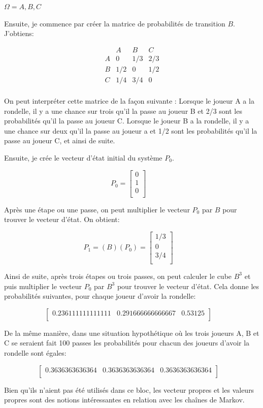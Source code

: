 \documentclass[10pt]{article}
\begin{document}
$\Omega={A, B, C}$


Ensuite, je commence par créer la matrice de probabilités de transition $B$.
J'obtiens:


\[
        \begin{array}{c|ccc}
	& A & B & C\\
	\hline
	A & 0 & 1/3 & 2/3\\
	B & 1/2 & 0 & 1/2\\
	C & 1/4 & 3/4 & 0\\
	\end{array}
\]



On peut interpréter cette matrice de la façon suivante : Lorsque le joueur A a la rondelle, il y a une chance sur trois qu'il la passe au joueur B et 2/3 sont les probabilités qu'il la passe au joueur C.
Lorsque le joueur B a la rondelle, il y a une chance sur deux qu'il la passe au joueur a et 1/2 sont les probabilités qu'il la passe au joueur C, et ainsi de suite.


Ensuite,  je crée le vecteur d'état initial du système $P_0$.

\[
P_0 =	\begin{bmatrix} 
	0\\ 
	1\\ 
	0\\
	\end{bmatrix}
	\quad
\]

Après une étape ou une passe, on peut multiplier le vecteur $P_0$ par $B$ pour trouver le vecteur d'état.
On obtient:

\[
P_1 = (B)(P_0) =	\begin{bmatrix} 
	1/3\\
	0\\ 
	3/4\\
	\end{bmatrix}
	\quad
\]

Ainsi de suite, après trois étapes ou trois passes, on peut calculer le cube $B^3$ et puis multiplier le vecteur $P_0$ par $B^3$ pour trouver le vecteur d'état.
Cela donne les probabilités suivantes, pour chaque joueur d'avoir la rondelle:


\[
	\begin{bmatrix} 
	0.236111111111111 & 0.291666666666667 & 0.53125\\
	\end{bmatrix}
	\quad
\]


De la même manière, dans une situation hypothétique où les trois joueurs A, B et C se seraient fait 100 passes les probabilités pour chacun des joueurs d'avoir la rondelle sont égales:


\[
	\begin{bmatrix} 
	0.3636363636364 & 0.3636363636364 & 0.3636363636364\\
	\end{bmatrix}
	\quad
\]


Bien qu'ils n'aient pas été utilisés dans ce bloc, les vecteur propres et les valeurs propres sont des notions intéressantes en relation avec les chaînes de Markov.

\nocite{*}


\end{document}

